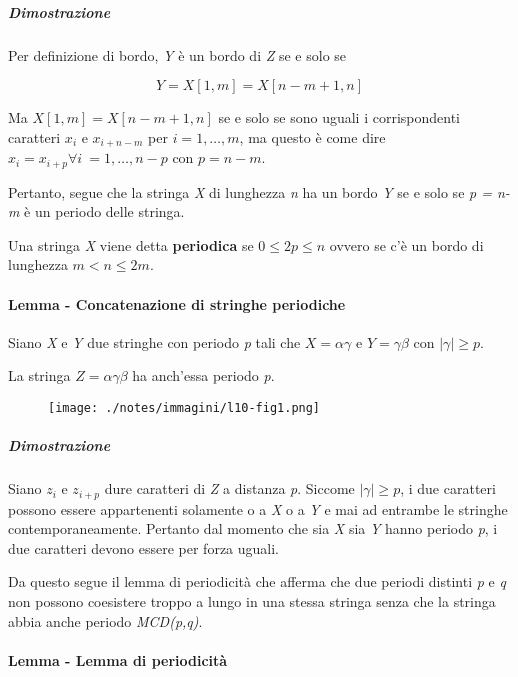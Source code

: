 \subparagraph{Dimostrazione}\label{dimostrazione}

Per definizione di bordo, \emph{Y} è un bordo di \emph{Z} se e solo se

$$
Y = X[1,m]=X[n-m+1,n]
$$

Ma $X[1,m] = X[n-m+1,n]$ se e solo se sono uguali i corrispondenti caratteri $x_i$ e $x_{i+n-m}$ per $i = 1, \ldots, m$, ma questo è come dire $x_i = x_{i+p} \forall i \: = 1,\ldots, n-p $ con $p  = n-m$. 

Pertanto, segue che la stringa \textit{X} di lunghezza \textit{n} ha un bordo \textit{Y} se e solo se \textit{p = n-m} è un periodo delle stringa.

Una stringa \emph{X} viene detta \textbf{periodica} se
$0 \leq 2p \leq n$ ovvero se c'è un bordo di lunghezza
$m  < n \leq 2m$.

\paragraph{Lemma - Concatenazione di stringhe periodiche}\label{lemma---concatenazione-di-stringhe-periodiche}

Siano \emph{X} e \emph{Y} due stringhe con periodo \emph{p} tali che $X = \alpha\gamma$ e $Y = \gamma\beta$ con $|\gamma| \geq p$.

La stringa $Z = \alpha\gamma\beta$ ha anch'essa periodo \emph{p}.

\begin{figure}[htbp]
\centering
\texttt{[image: ./notes/immagini/l10-fig1.png]}
\end{figure}

\subparagraph{Dimostrazione}\label{dimostrazione-1}

Siano $ z_i $ e $ z_{i+p} $ dure caratteri di \textit{Z} a distanza \textit{p}. Siccome $ |\gamma|  \geq p$, i due caratteri possono essere appartenenti solamente o a \textit{X} o a \textit{Y} e mai ad entrambe le stringhe contemporaneamente. 
Pertanto dal momento che sia \textit{X} sia \textit{Y} hanno periodo \textit{p}, i due caratteri devono essere per forza uguali.

Da questo segue il lemma di periodicità che afferma che due periodi distinti \emph{p} e \emph{q} non possono coesistere troppo a lungo in
una stessa stringa senza che la stringa abbia anche periodo \emph{MCD(p,q)}.

\paragraph{Lemma - Lemma di periodicità}\label{lemma---lemma-di-periodicituxe0}

